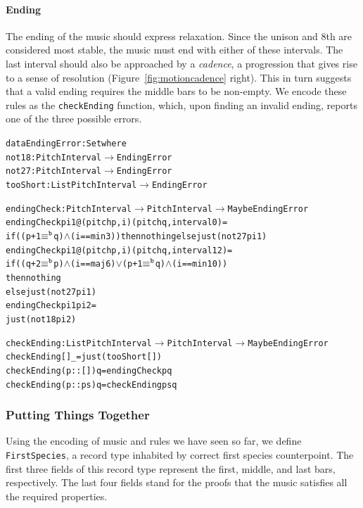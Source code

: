 \paragraph{Ending}

The ending of the music should express relaxation.
Since the unison and 8th are considered most stable, the music
must end with either of these intervals.
The last interval should also be approached by a \emph{cadence},
a progression that gives rise to a sense of resolution
(Figure~\ref{fig:motioncadence} right).
This in turn suggests that a valid ending requires the middle bars
to be non-empty.
We encode these rules as the \texttt{checkEnding} function, which,
upon finding an invalid ending, reports one of the three possible
errors.

\begin{alltt}
data EndingError : Set where
  not18    : PitchInterval      \(\rightarrow\) EndingError
  not27    : PitchInterval      \(\rightarrow\) EndingError
  tooShort : List PitchInterval \(\rightarrow\) EndingError

endingCheck : PitchInterval \(\rightarrow\) PitchInterval \(\rightarrow\) Maybe EndingError
endingCheck pi1@(pitch p , i) (pitch q , interval 0)  = 
  if ((p + 1 \(\equiv\sp{\mathtt{b}}\) q) \(\wedge\) (i == min3)) then nothing else just (not27 pi1)
endingCheck pi1@(pitch p , i) (pitch q , interval 12) =
  if ((q + 2 \(\equiv\sp{\mathtt{b}}\) p) \(\wedge\) (i == maj6) \(\vee\) (p + 1 \(\equiv\sp{\mathtt{b}}\) q) \(\wedge\) (i == min10))
  then nothing
  else just (not27 pi1)
endingCheck pi1               pi2                     =
  just (not18 pi2)

checkEnding : List PitchInterval \(\rightarrow\) PitchInterval \(\rightarrow\) Maybe EndingError
checkEnding []        \_ = just (tooShort [])
checkEnding (p :: []) q = endingCheck p q
checkEnding (p :: ps) q = checkEnding ps q
\end{alltt}

\subsubsection{Putting Things Together}

Using the encoding of music and rules we have seen so far, we define
\texttt{FirstSpecies}, a record type inhabited by correct first species
counterpoint.
The first three fields of this record type represent the first, middle,
and last bars, respectively.
The last four fields stand for the proofs that the music satisfies all
the required properties.

